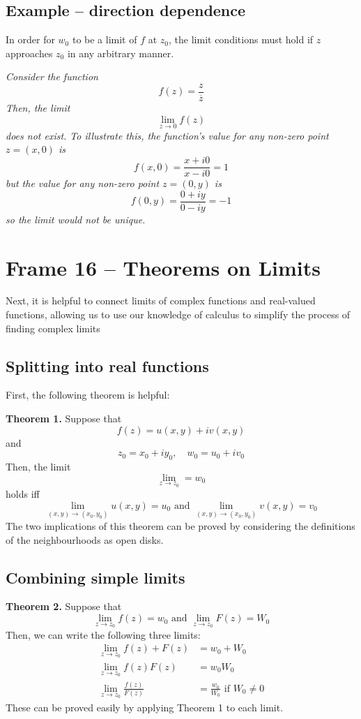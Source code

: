 \documentclass{article}
\renewcommand{\bar}{\overline}
\begin{document}
\subsection{Example -- direction dependence}
In order for $w_0$ to be a limit of $f$ at $z_0$, the limit conditions must hold if $z$ approaches $z_0$ in any arbitrary manner. 

\textit{Consider the function
\[
	f(z) = \frac{z}{\bar{z}}
\] 
Then, the limit
\[
	\lim_{z \to 0} f(z)
\]
does not exist. To illustrate this, the function's value for any non-zero point $z = (x, 0)$ is
\[
	f(x, 0) = \frac{x + i0}{x - i0} = 1
\]
but the value for any non-zero point $z = (0, y)$ is
\[
	f(0, y) = \frac{0 + iy}{0 - iy} = -1
\]
so the limit would not be unique.
}


\clearpage
\section{Frame 16 -- Theorems on Limits}
Next, it is helpful to connect limits of complex functions and real-valued functions, allowing us to use our knowledge of calculus to simplify the process of finding complex limits

\subsection{Splitting into real functions}
First, the following theorem is helpful:

\textbf{Theorem 1.} Suppose that
\[
	f(z) = u(x, y) + iv(x, y)
\]
and
\[
	z_0 = x_0 + iy_0, \quad	w_0 = u_0 + iv_0
\]
Then, the limit
\[
	\lim_{z \to z_0} = w_0
\]
holds iff
\[
	\lim_{(x,y) \to (x_0, y_0)} u(x, y) = u_0 \text{ and } 
	\lim_{(x,y) \to (x_0, y_0)} v(x, y) = v_0
\]
The two implications of this theorem can be proved by considering the definitions of the neighbourhoods as open disks.

\subsection{Combining simple limits}
\textbf{Theorem 2.} Suppose that
\[
	\lim_{z \to z_0} f(z) = w_0 \text{ and } \lim_{z \to z_0} F(z) = W_0
\]
Then, we can write the following three limits:
\begin{align*}
	\lim_{z \to z_0} f(z) + F(z) &= w_0 + W_0 \\
	\lim_{z \to z_0} f(z) F(z) &= w_0 W_0 \\
	\lim_{z \to z_0} \frac{f(z)}{F(z)} &= \frac{w_0}{W_0} \text{ if } W_0 \neq 0
\end{align*}
These can be proved easily by applying Theorem 1 to each limit.
\end{document}
